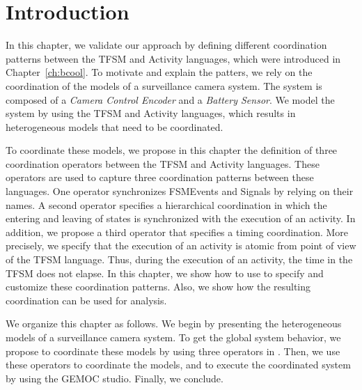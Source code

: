\section{Introduction}
In this chapter, we validate our approach by defining different coordination patterns between the TFSM and Activity languages, which were introduced in Chapter~\ref{ch:bcool}. To motivate and explain the patters, we rely on the coordination of the models of a surveillance camera system. The system is composed of a \emph{Camera Control Encoder} and a \emph{Battery Sensor}. We model the system by using the TFSM and Activity languages, which results in heterogeneous models that need to be coordinated. 
	
To coordinate these models, we propose in this chapter the definition of three \bcool coordination operators between the TFSM and Activity languages. These operators are used to capture three coordination patterns between these languages. One operator synchronizes FSMEvents and Signals by relying on their names. A second operator specifies a hierarchical coordination in which the entering and leaving of states is synchronized with the execution of an activity. In addition, we propose a third operator that specifies a timing coordination. More precisely, we specify that the execution of an activity is atomic from point of view of the TFSM language. Thus, during the execution of an activity, the time in the TFSM does not elapse. In this chapter, we show how to use \bcool to specify and customize these coordination patterns. Also, we show how the resulting coordination can be used for analysis.
		
We organize this chapter as follows. We begin by presenting the heterogeneous models of a surveillance camera system. To get the global system behavior, we propose to coordinate these models by using three operators in \bcool. Then, we use these operators to coordinate the models, and to execute the coordinated system by using the GEMOC studio. Finally, we conclude.
		

